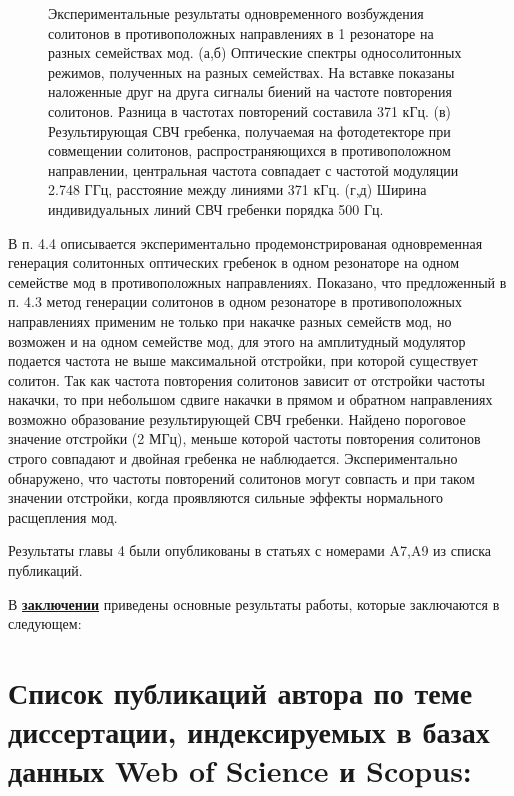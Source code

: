 \begin{figure}[!htb]
\begin{minipage}{1\linewidth}
\end{minipage}
\caption{Экспериментальные результаты одновременного возбуждения солитонов в противоположных направлениях в 1 резонаторе на разных семействах мод. (а,б) Оптические спектры односолитонных режимов, полученных на разных семействах. На вставке показаны наложенные друг на друга сигналы биений на частоте повторения солитонов. Разница в частотах повторений составила 371 кГц. (в) Результирующая СВЧ гребенка, получаемая на фотодетекторе при совмещении солитонов, распространяющихся в противоположном направлении, центральная частота совпадает с частотой модуляции 2.748 ГГц, расстояние между линиями 371 кГц. (г,д) Ширина индивидуальных линий СВЧ гребенки порядка 500 Гц.}
\label{counter_prop_results}
\end{figure}

В п. 4.4 описывается экспериментально продемонстрированая одновременная генерация солитонных оптических гребенок в одном резонаторе на одном семействе мод в противоположных направлениях. Показано, что предложенный в п. 4.3 метод генерации солитонов в одном резонаторе в противоположных направлениях применим не только при накачке разных семейств мод, но возможен и на одном семействе мод, для этого на амплитудный модулятор подается частота не выше максимальной отстройки, при которой существует солитон. Так как частота повторения солитонов зависит от отстройки частоты накачки, то при небольшом сдвиге накачки в прямом и обратном направлениях возможно образование результирующей СВЧ гребенки. Найдено пороговое значение отстройки (2 МГц), меньше которой частоты повторения солитонов строго совпадают и двойная гребенка не наблюдается. Экспериментально обнаружено, что частоты повторений солитонов могут совпасть и при таком значении отстройки, когда проявляются сильные эффекты нормального расщепления мод.

Результаты главы 4 были опубликованы в статьях с номерами A7,A9 из списка публикаций.

В \underline{\textbf{заключении}} приведены основные результаты работы, которые заключаются в следующем:



\section*{Список публикаций автора по теме диссертации, индексируемых в базах данных Web of Science и Scopus:}

